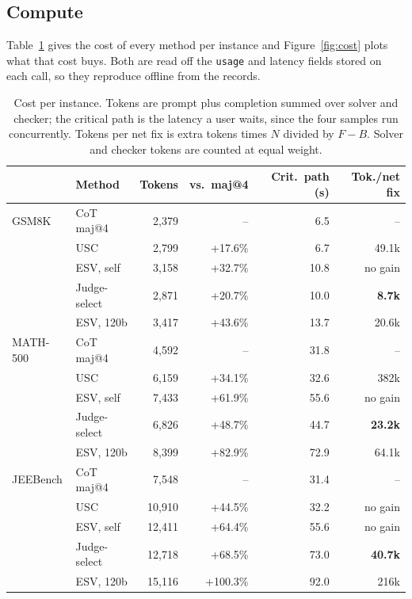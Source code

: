 \documentclass[letterpaper]{article} %
\begin{document}
\subsection{Compute}
\label{app:compute}

Table~\ref{tab:compute} gives the cost of every method per instance and
Figure~\ref{fig:cost} plots what that cost buys. Both are read off the
\texttt{usage} and latency fields stored on each call, so they reproduce offline
from the records.

\begin{table}[!ht]
\centering
\small
\setlength{\tabcolsep}{3pt}
\begin{tabular}{llrrrr}
\toprule
 & Method & Tokens & vs.\ maj@4 & Crit.\ path (s) & Tok./net fix \\
\midrule
GSM8K & CoT maj@4 & 2{,}379 & -- & 6.5 & -- \\
 & USC & 2{,}799 & +17.6\% & 6.7 & 49.1k \\
 & ESV, self & 3{,}158 & +32.7\% & 10.8 & no gain \\
 & Judge-select & 2{,}871 & +20.7\% & 10.0 & \textbf{8.7k} \\
 & ESV, 120b & 3{,}417 & +43.6\% & 13.7 & 20.6k \\
\midrule
MATH-500 & CoT maj@4 & 4{,}592 & -- & 31.8 & -- \\
 & USC & 6{,}159 & +34.1\% & 32.6 & 382k \\
 & ESV, self & 7{,}433 & +61.9\% & 55.6 & no gain \\
 & Judge-select & 6{,}826 & +48.7\% & 44.7 & \textbf{23.2k} \\
 & ESV, 120b & 8{,}399 & +82.9\% & 72.9 & 64.1k \\
\midrule
JEEBench & CoT maj@4 & 7{,}548 & -- & 31.4 & -- \\
 & USC & 10{,}910 & +44.5\% & 32.2 & no gain \\
 & ESV, self & 12{,}411 & +64.4\% & 55.6 & no gain \\
 & Judge-select & 12{,}718 & +68.5\% & 73.0 & \textbf{40.7k} \\
 & ESV, 120b & 15{,}116 & +100.3\% & 92.0 & 216k \\
\bottomrule
\end{tabular}
\caption{Cost per instance. Tokens are prompt plus completion summed over solver and checker; the critical path is the latency a user waits, since the four samples run concurrently. Tokens per net fix is extra tokens times $N$ divided by $F-B$. Solver and checker tokens are counted at equal weight.}
\label{tab:compute}
\end{table}
\end{document}
